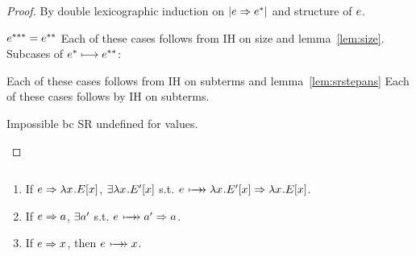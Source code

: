 \documentclass{article}
\begin{document}
\begin{proof}
By double lexicographic induction on $\size{\e \pstep \eone}$ and structure of
$\e$.
\begin{byCases}
  \case{\e = \eone} $\ethree = \etwo$
  Each of these cases follows from IH on size and lemma~\ref{lem:size}.
  Subcases of $\eone \srstep \etwo$:
  \renewcommand{\byCasesCaseTemplate}[1]{\textbf{Subcase {#1}.}}
  \begin{byCases}
    Each of these cases follows from IH on subterms and
    lemma~\ref{lem:srstepans}
    Each of these cases follows by IH on subterms.
  \end{byCases}
  \renewcommand{\byCasesCaseTemplate}[1]{\textbf{Case {#1}.}}
   Impossible bc SR undefined for values.
\end{byCases}
\end{proof}






\begin{lemma}
\label{lem:srstepans}$\;$
\begin{enumerate}
\item If $\e \pstep \lxEx$, $\exists \lxEx[']$ s.t. $\e \srsteps \lxEx[']
  \pstep \lxEx$.
\item If $\e \pstep \ans$, $\exists \ans'$ s.t. $\e \srsteps \ans' \pstep
  \ans$.
\item If $\e \pstep x$, then $\e \srsteps x$.
\end{enumerate}
\end{lemma}
\end{document}

